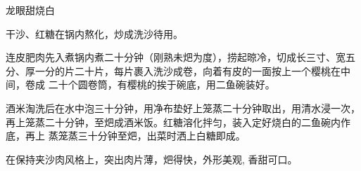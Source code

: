 \begin{recipe}{龙眼甜烧白}

\ingredients


\preparation

\step 干沙、红糖在锅内熬化，炒成洗沙待用。

\step 连皮肥肉先入煮锅内煮二十分钟（刚熟未𤆵为度），捞起晾冷，切成长三寸、宽五
分、厚一分的片二十片，每片裹入洗沙成卷，向着有皮的一面按上一个樱桃在中间，卷成
二十个圆卷筒，有樱桃的挨于碗底，用二鱼碗装好。

\step 酒米淘洗后在水中泡三十分钟，用净布垫好上笼蒸二十分钟取出，用清水浸一次，
再上笼蒸二十分钟，至𤆵成酒米饭。红糖溶化拌匀，装入定好烧白的二鱼碗内作底，再上
蒸笼蒸三十分钟至𤆵，出菜时洒上白糖即成。

\features

在保持夹沙肉风格上，突出肉片薄，𤆵得快，外形美观, 香甜可口。

\end{recipe}

